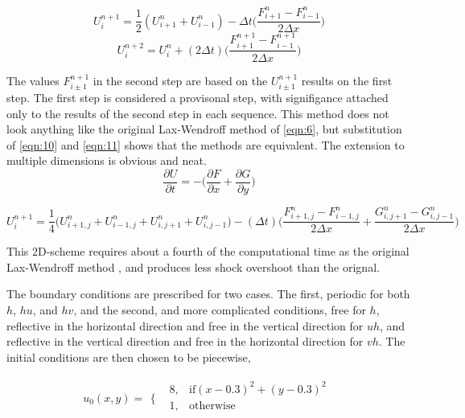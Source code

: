 \begin{equation}\label{eqn:8}
U_{i}^{n+1} = \frac{1}{2}(U_{i+1}^{n}+U_{i-1}^{n})-\Delta{t} \Big(\frac{F_{i+1}^{n}-F_{i-1}^{n}}{2\Delta x}\Big)
\end{equation}
\begin{equation}\label{eqn:9}
U_{i}^{n+2} = U_{i}^{n} + (2\Delta t) \Big ( \frac{ F_{i+1}^{n+1}-F_{i-1}^{n+1} }{ 2 \Delta x } \Big)
\end{equation} 
\newline

The values $F_{i \pm 1}^{n+1}$ in the second step are based on the $U_{i \pm 1}^{n+1}$ results on the first step. The first step is considered
a provisonal step, with signifigance attached only to the results of the second step in each sequence. This method does not look anything like the original
Lax-Wendroff method of \eqref{eqn:6}, but substitution of \eqref{eqn:10} and \eqref{eqn:11} shows that the methods are equivalent. 
\newline
The extension to multiple dimensions is obvious and neat.
\begin{equation}\label{eqn:10}
\frac{\partial U}{\partial t} = - \Big( \frac{\partial F}{\partial x} + \frac{\partial G}{\partial y} \Big)
\end{equation}

\begin{dmath}\label{eqn:11}
U_{i}^{n+1} = \frac{1}{4} \Big( U_{i+1,j}^{n} + U_{i-1,j}^{n} + U_{i,j+1}^{n} + U_{i,j-1}^{n} \Big) 
- (\Delta t) \Big( \frac{ F_{i+1,j}^{n} - F_{i-1,j}^{n} }{2 \Delta x}  + \frac{ G_{i,j+1}^{n} - G_{i,j-1}^{n} }{ 2 \Delta x }  \Big)
\end{dmath} 

This 2D-scheme requires about a fourth of the computational time as the original Lax-Wendroff method \cite{Roach}, and produces less shock
 overshoot than the orignal. 
\newline

The boundary conditions are prescribed for two cases. The first, periodic for both $h$, $hu$, and $hv$, and the second,
 and more complicated conditions, free for $h$, reflective in the horizontal direction and free in the vertical direction 
for $uh$, and reflective in the vertical direction and free in the horizontal direction for $vh$. The initial conditions are then
 chosen to be piecewise, 

\begin{equation}\label{eqn:12}
u_0(x,y)=
\begin{array}{ll}
\Big\{ & 
\begin{array}{ll}
 8, & \text{if} (x-0.3)^2+(y-0.3)^2 \\
 1, & \text{otherwise} \\
\end{array}
\end{array}
\end{equation}

